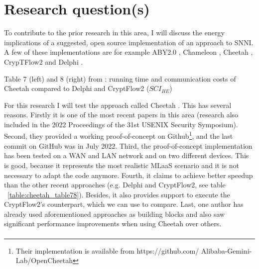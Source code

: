 \documentclass[../thesis.tex]{subfiles}
\begin{document}
\section{Research question(s)}
To contribute to the prior research in this area, I will discuss the energy implications of a suggested, open source implementation of an approach to SNNI. A few of these implementations are for example ABY2.0 \parencite{aby20}, Chameleon \parencite{chameleon}, Cheetah \parencite{cheetah}, CrypTFlow2 \parencite{cryptflow2} and Delphi \parencite{delphi}. 

\begin{table}
    \begin{adjustbox}{width=\columnwidth,center}
        
        \quad
        
    \end{adjustbox}
    \caption{Table 7 (left) and 8 (right) from \parencite[p. 821]{cheetah}: running time and communication costs of Cheetah compared to Delphi and CryptFlow2 (\textit{${SCI}_{HE}$})}
    \label{table:cheetah_table78}
\end{table}

For this research I will test the approach called Cheetah \parencite{cheetah}. This has several reasons. Firstly it is one of the most recent papers in this area (research also included in the 2022 Proceedings of the 31st USENIX Security Symposium). Second, they provided a working proof-of-concept on Github\footnote{Their implementation is available from https://github.com/
Alibaba-Gemini-Lab/OpenCheetah}, and the last commit on GitHub was in July 2022. Third, the proof-of-concept implementation has been tested on a WAN and LAN network and on two different devices. This is good, because it represents the most realistic MLaaS scenario \parencite{ribeiro2015mlaasml} and it is not necessary to adapt the code anymore. Fourth, it claims to achieve better speedup than the other recent approaches (e.g. Delphi and CryptFlow2, see table ~\ref{table:cheetah_table78}). Besides, it also provides support to execute the CryptFlow2's counterpart, which we can use to compare. Last, one author \parencite{dong2022} has already used aforementioned approaches as building blocks and also saw significant performance improvements when using Cheetah over others. \paragraph{}
\end{document}
